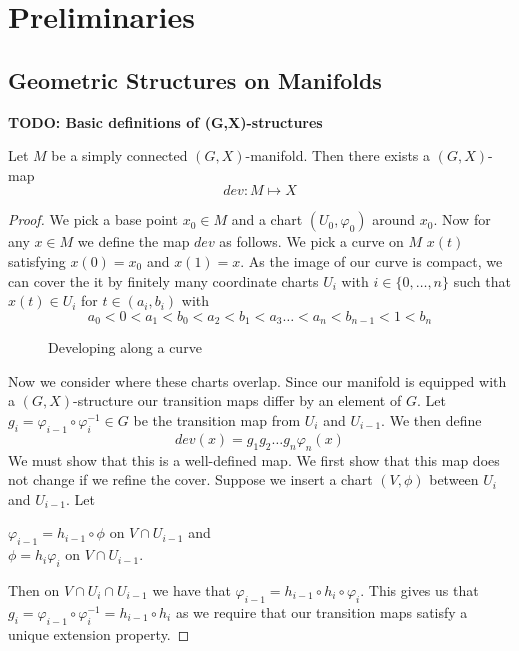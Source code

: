 \setcounter{chapter}{-1}
\chapter{Preliminaries}

\section{Geometric Structures on Manifolds}
\textbf{TODO: Basic definitions of (G,X)-structures}
\begin{prop}
    Let $M$ be a simply connected $(G,X)$-manifold. Then there exists a $(G,X)$-map
    $$
        dev: M \mapsto X
    $$
\end{prop}
\begin{proof}
    We pick a base point $x_0 \in M$ and a chart $(U_0, \varphi_0)$ around $x_0$. Now for any $x \in M$ we define the map $dev$ as follows. We pick a curve on $M$ $x(t)$ satisfying $x(0)=x_0$ and $x(1)=x$. As the image of our curve is compact, we can cover the it by finitely many coordinate charts $U_i$ with $i\in \{0, \dots,n\}$ such that $x(t) \in U_i$ for $t\in(a_i, b_i)$ with
    $$a_0<0<a_1<b_0<a_2<b_1<a_3 \dots <a_n<b_{n-1}<1<b_n$$

    \begin{figure}[H]
        \centering
        \caption{Developing along a curve}
    \end{figure}

    Now we consider where these charts overlap. Since our manifold is equipped with
    a $(G,X)$-structure our transition maps differ by an element of $G$. Let $g_i =
        \varphi_{i-1}\circ\varphi^{-1}_i \in G$ be the transition map from $U_i$ and
    $U_{i-1}$. We then define $$ dev(x) = g_1g_2\dots g_n \varphi_n(x) $$ We must
    show that this is a well-defined map. We first show that this map does not
    change if we refine the cover. Suppose we insert a chart $(V, \phi)$ between
    $U_i$ and $U_{i-1}$. Let
    \begin{center}
        $\varphi_{i-1} = h_{i-1}\circ\phi$ on $V \cap U_{i-1}$ and \\
        $\phi = h_i\varphi_{i}$ on $V \cap U_{i-1}$.
    \end{center}
    Then on $V \cap U_i \cap U_{i-1}$ we have that $\varphi_{i-1} = h_{i-1}\circ h_i \circ \varphi_{i}$. This gives us that $g_i = \varphi_{i-1}\circ \varphi^{-1}_i = h_{i-1} \circ h_i$ as we require that our transition maps satisfy a unique extension property.


\end{proof}
